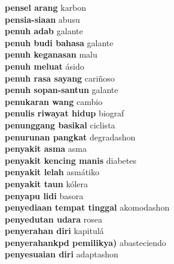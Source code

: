 \textbf{ pensel arang  } karbon \\
\textbf{ pensia-siaan  } abusu \\
\textbf{ penuh adab  } galante \\
\textbf{ penuh budi bahasa  } galante \\
\textbf{ penuh keganasan  } malu \\
\textbf{ penuh meluat  } ásido \\
\textbf{ penuh rasa sayang  } cariñoso \\
\textbf{ penuh sopan-santun  } galante \\
\textbf{ penukaran wang  } cambio \\
\textbf{ penulis riwayat hidup  } biograf \\
\textbf{ penunggang basikal  } ciclista \\
\textbf{ penurunan pangkat  } degradashon \\
\textbf{ penyakit asma  } asma \\
\textbf{ penyakit kencing manis  } diabetes \\
\textbf{ penyakit lelah  } asmátiko \\
\textbf{ penyakit taun  } kólera \\
\textbf{ penyapu lidi  } basora \\
\textbf{ penyediaan tempat tinggal  } akomodashon \\
\textbf{ penyedutan udara  } rosea \\
\textbf{ penyerahan diri  } kapitulá \\
\textbf{ penyerahankpd pemilikya)  } abasteciendo \\
\textbf{ penyesuaian diri  } adaptashon \\
